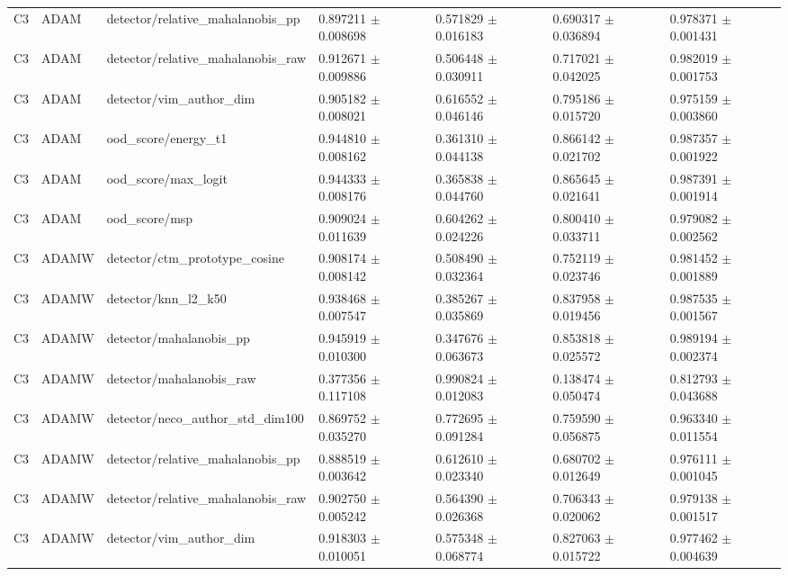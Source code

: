 \begin{longtable}{lllllll}
C3 & ADAM & detector/relative\_mahalanobis\_pp & 0.897211 $\pm$ 0.008698 & 0.571829 $\pm$ 0.016183 & 0.690317 $\pm$ 0.036894 & 0.978371 $\pm$ 0.001431 \\
C3 & ADAM & detector/relative\_mahalanobis\_raw & 0.912671 $\pm$ 0.009886 & 0.506448 $\pm$ 0.030911 & 0.717021 $\pm$ 0.042025 & 0.982019 $\pm$ 0.001753 \\
C3 & ADAM & detector/vim\_author\_dim & 0.905182 $\pm$ 0.008021 & 0.616552 $\pm$ 0.046146 & 0.795186 $\pm$ 0.015720 & 0.975159 $\pm$ 0.003860 \\
C3 & ADAM & ood\_score/energy\_t1 & 0.944810 $\pm$ 0.008162 & 0.361310 $\pm$ 0.044138 & 0.866142 $\pm$ 0.021702 & 0.987357 $\pm$ 0.001922 \\
C3 & ADAM & ood\_score/max\_logit & 0.944333 $\pm$ 0.008176 & 0.365838 $\pm$ 0.044760 & 0.865645 $\pm$ 0.021641 & 0.987391 $\pm$ 0.001914 \\
C3 & ADAM & ood\_score/msp & 0.909024 $\pm$ 0.011639 & 0.604262 $\pm$ 0.024226 & 0.800410 $\pm$ 0.033711 & 0.979082 $\pm$ 0.002562 \\
C3 & ADAMW & detector/ctm\_prototype\_cosine & 0.908174 $\pm$ 0.008142 & 0.508490 $\pm$ 0.032364 & 0.752119 $\pm$ 0.023746 & 0.981452 $\pm$ 0.001889 \\
C3 & ADAMW & detector/knn\_l2\_k50 & 0.938468 $\pm$ 0.007547 & 0.385267 $\pm$ 0.035869 & 0.837958 $\pm$ 0.019456 & 0.987535 $\pm$ 0.001567 \\
C3 & ADAMW & detector/mahalanobis\_pp & 0.945919 $\pm$ 0.010300 & 0.347676 $\pm$ 0.063673 & 0.853818 $\pm$ 0.025572 & 0.989194 $\pm$ 0.002374 \\
C3 & ADAMW & detector/mahalanobis\_raw & 0.377356 $\pm$ 0.117108 & 0.990824 $\pm$ 0.012083 & 0.138474 $\pm$ 0.050474 & 0.812793 $\pm$ 0.043688 \\
C3 & ADAMW & detector/neco\_author\_std\_dim100 & 0.869752 $\pm$ 0.035270 & 0.772695 $\pm$ 0.091284 & 0.759590 $\pm$ 0.056875 & 0.963340 $\pm$ 0.011554 \\
C3 & ADAMW & detector/relative\_mahalanobis\_pp & 0.888519 $\pm$ 0.003642 & 0.612610 $\pm$ 0.023340 & 0.680702 $\pm$ 0.012649 & 0.976111 $\pm$ 0.001045 \\
C3 & ADAMW & detector/relative\_mahalanobis\_raw & 0.902750 $\pm$ 0.005242 & 0.564390 $\pm$ 0.026368 & 0.706343 $\pm$ 0.020062 & 0.979138 $\pm$ 0.001517 \\
C3 & ADAMW & detector/vim\_author\_dim & 0.918303 $\pm$ 0.010051 & 0.575348 $\pm$ 0.068774 & 0.827063 $\pm$ 0.015722 & 0.977462 $\pm$ 0.004639 \\

\end{longtable}
